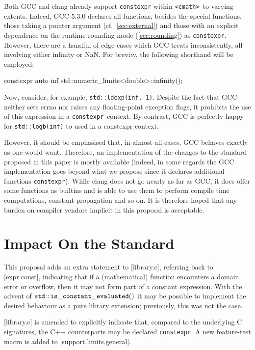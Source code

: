 \documentclass[prd,twocolumn,amsmath,amssymb,nofootinbib,eqsecnum]{revtex4-1}
\newcommand{\constexpr}{\code{constexpr}\xspace}
\newcommand{\code}[1]{{\tt #1}}
\newcommand{\header}[1]{{\tt <#1>}}
\newcommand{\cmath}{\header{cmath}}
\begin{document}
Both GCC and clang already support \constexpr within \cmath\ to varying extents. 
Indeed, GCC 5.3.0 declares all functions, besides the special functions, those taking a pointer argument
(cf.~\ref{sec:external}) and those with an explicit dependence on the runtime rounding mode (\ref{sec:rounding}) as \constexpr. However, there are a handful of edge cases which GCC treats inconsistently, all involving either infinity or NaN. For brevity, the following shorthand will be employed:\vspace{3ex}
\begin{verbbox}
	constexpr auto inf{
	    std::numeric_limits<double>::infinity()};
\end{verbbox}
\theverbbox
\vspace{3ex}
Now, consider, for example, \code{std::ldexp(inf, 1)}. Despite the fact that GCC neither sets errno nor raises any floating-point exception flags, it prohibits the use of this expression in a \constexpr\ context. By contrast, GCC is perfectly happy for \code{std::logb(inf)} to used in a constexpr context.

However, it should be emphasised that, in almost all cases, GCC behaves exactly as one would want. Therefore, an implementation of the changes to the standard proposed in this paper is mostly available (indeed, in some regards the GCC implementation goes beyond what we propose since it declares additional functions \constexpr).
While clang does not go nearly as far as GCC, it does offer some functions as 
builtins and is able to use them to perform compile time computations, constant
propagation and so on. It is therefore hoped that any burden on compiler vendors implicit in this
proposal is acceptable.

\section{Impact On the Standard}
\label{sec:impact}

This proposal adds an extra statement to [library.c], referring back to [expr.const], indicating that if a (mathematical) function encounters a domain error or overflow, then it may not form part of a constant expression. With the advent of $\code{std\!::\!is\_constant\_evaluated()}$ it may be possible to implement the desired behaviour as a pure library extension; previously, this was not the case.

[library.c] is amended to explicitly indicate that, compared to the underlying C signatures, the C++ counterparts may be declared \constexpr. A new feature-test macro is added to [support.limits.general].
\end{document}
